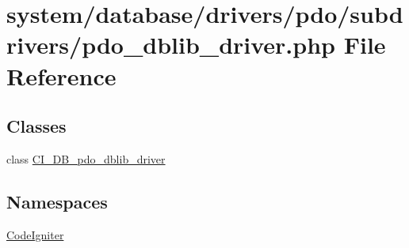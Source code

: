 \hypertarget{pdo__dblib__driver_8php}{}\section{system/database/drivers/pdo/subdrivers/pdo\+\_\+dblib\+\_\+driver.php File Reference}
\label{pdo__dblib__driver_8php}
\subsection*{Classes}
\begin{DoxyCompactItemize}
\item 
class \mbox{\hyperlink{class_c_i___d_b__pdo__dblib__driver}{C\+I\+\_\+\+D\+B\+\_\+pdo\+\_\+dblib\+\_\+driver}}
\end{DoxyCompactItemize}
\subsection*{Namespaces}
\begin{DoxyCompactItemize}
\item 
 \mbox{\hyperlink{namespace_code_igniter}{Code\+Igniter}}
\end{DoxyCompactItemize}
